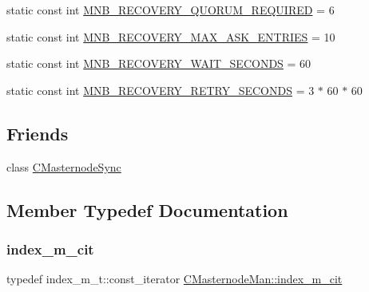 \begin{DoxyCompactItemize}
\item 
static const int \mbox{\hyperlink{class_c_masternode_man_ac5c2c09dcb443aaa1e9cb110e6a9a0c7}{M\+N\+B\+\_\+\+R\+E\+C\+O\+V\+E\+R\+Y\+\_\+\+Q\+U\+O\+R\+U\+M\+\_\+\+R\+E\+Q\+U\+I\+R\+ED}} = 6
\item 
static const int \mbox{\hyperlink{class_c_masternode_man_a69e937317e5b5f46741dcd8e875ec120}{M\+N\+B\+\_\+\+R\+E\+C\+O\+V\+E\+R\+Y\+\_\+\+M\+A\+X\+\_\+\+A\+S\+K\+\_\+\+E\+N\+T\+R\+I\+ES}} = 10
\item 
static const int \mbox{\hyperlink{class_c_masternode_man_a11bd3f19f5732a780e8eb6b2b0fa9914}{M\+N\+B\+\_\+\+R\+E\+C\+O\+V\+E\+R\+Y\+\_\+\+W\+A\+I\+T\+\_\+\+S\+E\+C\+O\+N\+DS}} = 60
\item 
static const int \mbox{\hyperlink{class_c_masternode_man_ab8ec23531031fa16183b71f154d420d9}{M\+N\+B\+\_\+\+R\+E\+C\+O\+V\+E\+R\+Y\+\_\+\+R\+E\+T\+R\+Y\+\_\+\+S\+E\+C\+O\+N\+DS}} = 3 $\ast$ 60 $\ast$ 60
\end{DoxyCompactItemize}
\subsection*{Friends}
\begin{DoxyCompactItemize}
\item 
class \mbox{\hyperlink{class_c_masternode_man_a715fd682c3b54153bd27eebd6ca045cc}{C\+Masternode\+Sync}}
\end{DoxyCompactItemize}


\subsection{Member Typedef Documentation}
\mbox{\label{class_c_masternode_man_aaea1e2a29229c34a6330f36c071b56da}} 
\subsubsection{\texorpdfstring{index\+\_\+m\+\_\+cit}{index\_m\_cit}}
{\footnotesize\ttfamily typedef index\+\_\+m\+\_\+t\+::const\+\_\+iterator \mbox{\hyperlink{class_c_masternode_man_aaea1e2a29229c34a6330f36c071b56da}{C\+Masternode\+Man\+::index\+\_\+m\+\_\+cit}}}

\mbox{\label{class_c_masternode_man_a3eb6485ee143b7b95b2765f185b8170e}} 
